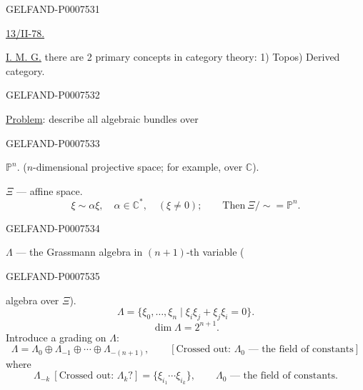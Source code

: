 \begin{GelfandAdjacentEvidence}{GELFAND-P000753}{1}

\underline{13/II-78.}\qquad {}

\underline{I. M. G.} there are 2 primary concepts in category theory:
1) Topos) Derived category.

\end{GelfandAdjacentEvidence}
\begin{GelfandAdjacentEvidence}{GELFAND-P000753}{2}


\underline{Problem}: describe all algebraic bundles over
\end{GelfandAdjacentEvidence}
\begin{GelfandAdjacentEvidence}{GELFAND-P000753}{3}

\(\mathbb P^n\).
(\(n\)-dimensional projective space; for example, over \(\mathbb C\)).

\(\Xi\) --- affine space.
\[
\xi\sim\alpha\xi,\quad \alpha\in\mathbb C^*,\quad (\xi\ne0);
\qquad \text{Then}\ \Xi/{\sim}=\mathbb P^n.
\]
\end{GelfandAdjacentEvidence}
\begin{GelfandAdjacentEvidence}{GELFAND-P000753}{4}


\(\Lambda\) --- the Grassmann algebra in \((n+1)\)-th variable
(
\end{GelfandAdjacentEvidence}
\begin{GelfandAdjacentEvidence}{GELFAND-P000753}{5}

algebra over \(\Xi\)).
\[
\Lambda=\{\xi_0,\ldots,\xi_n\mid
\xi_i\xi_j+\xi_j\xi_i=0\}.
\]
\[
\dim\Lambda=2^{n+1}.
\]
Introduce a grading on \(\Lambda\):
\begin{equation*}
\Lambda=\Lambda_0\oplus\Lambda_{-1}\oplus\cdots\oplus\Lambda_{-(n+1)},
\qquad [\text{Crossed out: }\Lambda_0\text{ --- the field of constants}]
\tag{1}
\end{equation*}
where
\[
\Lambda_{-k}\ [\text{Crossed out: }\Lambda_k?]
=\{\xi_{i_1}\cdots\xi_{i_k}\},\qquad
\Lambda_0\text{ --- the field of constants}.
\]
\end{GelfandAdjacentEvidence}
